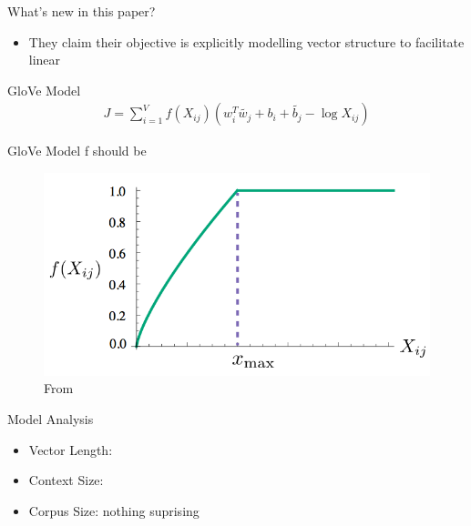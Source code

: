 \begin{frame}{What's new in this paper?}
  \begin{itemize}
  \item They claim their objective is explicitly modelling vector structure to facilitate linear 
  \end{itemize}
\end{frame}

\begin{frame}{GloVe Model}
\begin{align*}
J = \sum_{i=1}^V f(X_{ij})(w_i^T\tilde{w_j} +b_i + \tilde{b_j} - \log X_{ij})
\end{align*}
\end{frame}

\begin{frame}{GloVe Model}
f should be
    \begin{figure}
      \includegraphics[scale=0.27]{images/weighting.png}
      \caption{From}
    \end{figure}
\end{frame}


\begin{frame}{Model Analysis}
  \begin{itemize}
  \item Vector Length:
  \item Context Size: 
  \item Corpus Size: nothing suprising
  \end{itemize}
\end{frame}

